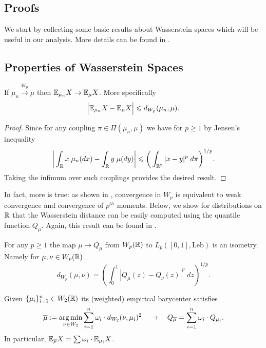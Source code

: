 \newpage
\begin{subappendices}

\section{Proofs}

We start by collecting some basic results about Wasserstein spaces which will be useful
in our analysis. More details can be found in \cite{panaretos2020_statistics_wasserstein_space}.

\subsection{Properties of Wasserstein Spaces}

\begin{lemma}
\label{lem:conv_Wp_implies_means_conv}
    If $\mu_n \xrightarrow{W_p} \mu$ then $\mathbb{E}_{\mu_n} X \to \mathbb{E}_\mu X$. More specifically
%
    \[\Big| \mathbb{E}_{\mu_n} X - \mathbb{E}_\mu X \Big| \leqslant d_{W_p}(\mu_n, \mu).\]
%
\end{lemma}
\begin{proof}
    \noindent Since for any coupling $\pi \in \Pi(\mu_n, \mu)$ we have for $p \geq 1$ by Jensen's inequality
        \[\bigg|\int_{\mathbb{R}} x \; \mu_n(dx) - \int_{\mathbb{R}} y \; \mu(dy) \bigg| \leqslant \bigg(\int_{\mathbb{R}^2} |x - y|^p \; d\pi \bigg)^{1/p}. \]
    \noindent Taking the infimum over such couplings provides the desired result.
\end{proof}

In fact, more is true: as shown in \cite{panaretos2020_statistics_wasserstein_space}, convergence in $W_p$ is equivalent
 to weak convergence and convergence of $p^{th}$ moments. Below, we show for distributions on $\mathbb{R}$
 that the Wasserstein distance can be easily computed using the quantile function $Q_\mu$. Again, this result
 can be found in \cite{panaretos2020_statistics_wasserstein_space}.

\begin{lemma}
\label{lem:quantile_fns_are_isometry}
    For any $p \geq 1$ the map $\mu \mapsto Q_\mu$ from $W_p(\mathbb{R})$ to $L_p([0,1], \mathrm{Leb})$ is an isometry. Namely for $\mu, \nu \in W_p(\mathbb{R})$
    \[d_{W_p}(\mu, \nu) = \left(\int_0^1 |Q_\mu(z) - Q_\nu(z)|^p \; dz \right)^{1/p}.\]
\end{lemma}

\begin{lemma}
\label{lem:quantile_of_w2_barycenter}
    Given $\{\mu_i\}_{i=1}^n \in W_2(\mathbb{R})$ its (weighted) empirical barycenter satisfies
    \[\overline{\mu} := \operatorname*{arg\,min}_{\nu \in W_2} \sum_{i=1}^n \omega_i \cdot d_{W_2}(\nu, \mu_i)^2 \quad \to \quad Q_{\overline{\mu}} =  \sum_{i=1}^n \omega_i \cdot Q_{\mu_i}.\]
    \noindent In particular, $\mathbb{E}_{\overline{\mu}} X =  \sum \omega_i \cdot \mathbb{E}_{\mu_i} X$.


\end{lemma}
\end{subappendices}
